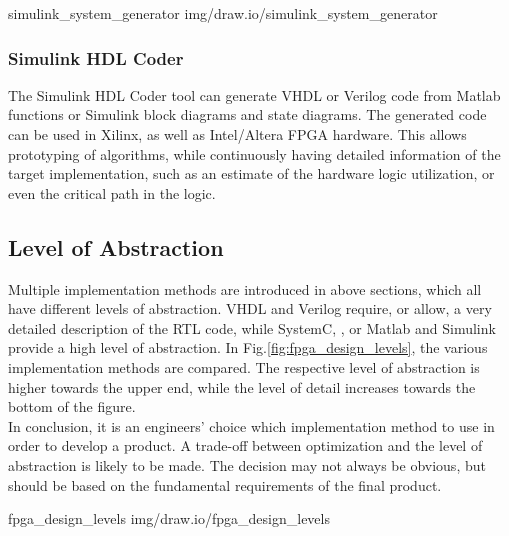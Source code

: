  {simulink_system_generator} {img/draw.io/simulink_system_generator}

\subsubsection{Simulink HDL Coder}

The Simulink HDL Coder tool can generate VHDL or Verilog code from Matlab functions or Simulink block diagrams and state diagrams.
The generated code can be used in Xilinx, as well as Intel/Altera FPGA hardware.
This allows prototyping of algorithms, while continuously having detailed information of the target implementation, such as an estimate of the hardware logic utilization, or even the critical path in the logic.

\subsection{Level of Abstraction}

Multiple implementation methods are introduced in above sections, which all have different levels of abstraction.
VHDL and Verilog require, or allow, a very detailed description of the RTL code, while SystemC, \cplusplus, or Matlab and Simulink provide a high level of abstraction.
In Fig.\ref{fig:fpga_design_levels}, the various implementation methods are compared.
The respective level of abstraction is higher towards the upper end, while the level of detail increases towards the bottom of the figure.\\

In conclusion, it is an engineers' choice which implementation method to use in order to develop a product.
A trade-off between optimization and the level of abstraction is likely to be made.
The decision may not always be obvious, but should be based on the fundamental requirements of the final product.

 {fpga_design_levels} {img/draw.io/fpga_design_levels}

